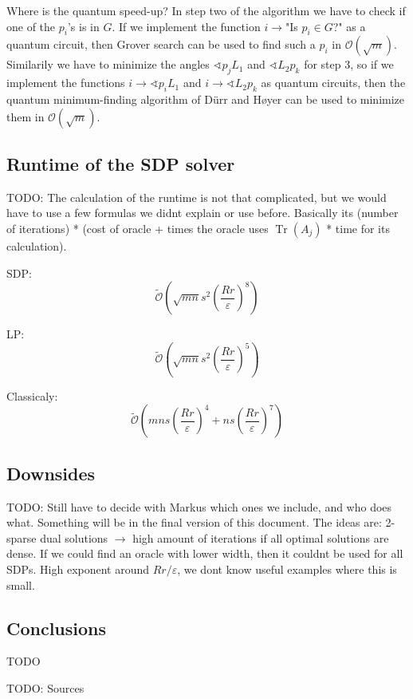 \documentclass[11pt,a4paper]{scrartcl}
\DeclareMathOperator{\Tr}{Tr}
\begin{document}
Where is the quantum speed-up? In step two of the algorithm we have to check if one of the $p_i$'s is in $G$. If we implement the function $i\to$"Is $p_i\in G$?" as a  quantum circuit, then Grover search can be used to find such a $p_i$ in $\mathcal{O}(\sqrt{m})$. Similarily we have to minimize the angles $\sphericalangle p_j L_1$ and $\sphericalangle L_2 p_k$ for step 3, so if we implement the functions $i\to\sphericalangle p_i L_1$ and $i\to \sphericalangle L_2 p_k$ as quantum circuits, then the quantum minimum-finding algorithm of Dürr and Høyer can be used to minimize them in $\mathcal{O}(\sqrt{m})$.


\subsection{Runtime of the SDP solver}

TODO: The calculation of the runtime is not that complicated, but we would have to use a few formulas we didnt explain or use before. Basically its (number of iterations) * (cost of oracle + times the oracle uses $\Tr(A_j)$ * time for its calculation). 

SDP:
\begin{equation*}
\tilde{\mathcal{O}}\left(\sqrt{mn}s^2\left(\frac{Rr}{\varepsilon}\right)^8\right)
\end{equation*}

LP:
\begin{equation*}
\tilde{\mathcal{O}}\left(\sqrt{mn}s^2\left(\frac{Rr}{\varepsilon}\right)^5\right)
\end{equation*}

Classicaly:
\begin{equation*}
\tilde{\mathcal{O}}\left(mns\left(\frac{Rr}{\varepsilon}\right)^4+ns\left(\frac{Rr}{\varepsilon}\right)^7\right)
\end{equation*}

\subsection{Downsides}
TODO: Still have to decide with Markus which ones we include, and who does what. Something will be in the final version of this document. The ideas are: 2-sparse dual solutions $\rightarrow$ high amount of iterations if all optimal solutions are dense. If we could find an oracle with lower width, then it couldnt be used for all SDPs. High exponent around $Rr/\varepsilon$, we dont know useful examples where this is small.

\subsection{Conclusions}
TODO

\vspace{1cm}
TODO: Sources

\printbibliography
\end{document}

